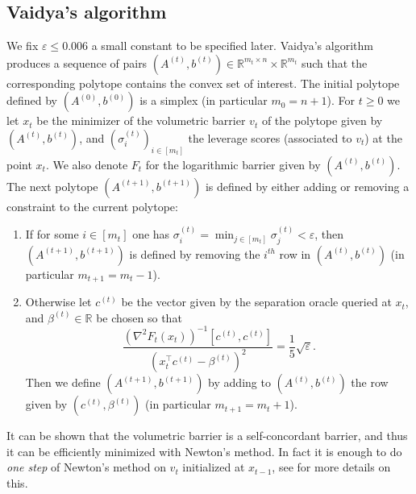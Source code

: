 \documentclass[openany]{now}
\renewcommand{\epsilon}{\varepsilon}
\begin{document}
\subsection{Vaidya's algorithm}
We fix $\epsilon \leq 0.006$ a small constant to be specified later. Vaidya's algorithm produces a sequence of pairs $(A^{(t)}, b^{(t)}) \in \mathbb{R}^{m_t \times n} \times \mathbb{R}^{m_t}$ such that the corresponding polytope contains the convex set of interest. The initial polytope defined by $(A^{(0)},b^{(0)})$ is a simplex (in particular $m_0=n+1$). For $t\geq0$ we let $x_t$ be the minimizer of the volumetric barrier $v_t$ of the polytope given by $(A^{(t)}, b^{(t)})$, and $(\sigma_i^{(t)})_{i \in [m_t]}$ the leverage scores (associated to $v_t$) at the point $x_t$. We also denote $F_t$ for the logarithmic barrier given by $(A^{(t)}, b^{(t)})$. The next polytope $(A^{(t+1)}, b^{(t+1)})$ is defined by either adding or removing a constraint to the current polytope:
\begin{enumerate}
\item If for some $i \in [m_t]$ one has $\sigma_i^{(t)} = \min_{j \in [m_t]} \sigma_j^{(t)} < \epsilon$, then $(A^{(t+1)}, b^{(t+1)})$ is defined by removing the $i^{th}$ row in $(A^{(t)}, b^{(t)})$ (in particular $m_{t+1} = m_t - 1$).
\item Otherwise let $c^{(t)}$ be the vector given by the separation oracle queried at $x_t$, and $\beta^{(t)} \in \mathbb{R}$ be chosen so that 
$$\frac{(\nabla^2 F_t(x_t) )^{-1}[c^{(t)}, c^{(t)}]}{(x_t^{\top} c^{(t)} - \beta^{(t)})^2} = \frac{1}{5} \sqrt{\epsilon} .$$
Then we define $(A^{(t+1)}, b^{(t+1)})$ by adding to $(A^{(t)}, b^{(t)})$ the row given by $(c^{(t)}, \beta^{(t)})$ (in particular $m_{t+1} = m_t + 1$).
\end{enumerate}
It can be shown that the volumetric barrier is a self-concordant barrier, and thus it can be efficiently minimized with Newton's method. In fact it is enough to do {\em one step} of Newton's method on $v_t$ initialized at $x_{t-1}$, see \cite{Vai89, Vai96} for more details on this.
\end{document}
